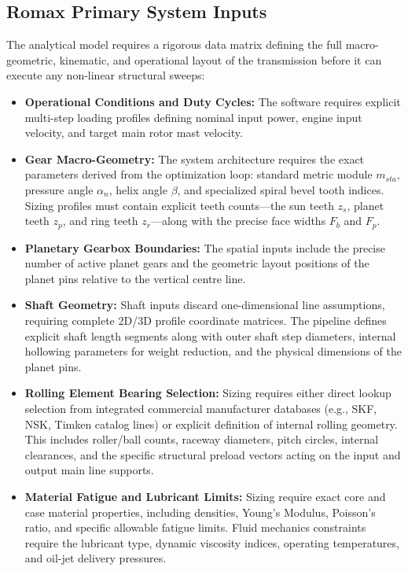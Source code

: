     \subsection{Romax Primary System Inputs}
        The analytical model requires a rigorous data matrix defining the full macro-geometric, 
        kinematic, and operational layout of the transmission before it can execute any non-linear 
        structural sweeps:
            \begin{itemize}
                \item \textbf{Operational Conditions and Duty Cycles:} The software requires explicit multi-step loading profiles defining nominal input power, engine input velocity, and target main rotor mast velocity.
                \item \textbf{Gear Macro-Geometry:} The system architecture requires the exact parameters derived from the optimization loop: standard metric module $m_{sta}$, pressure angle $\alpha_{n}$, helix angle $\beta$, and specialized spiral bevel tooth indices. Sizing profiles must contain explicit teeth counts—the sun teeth $z_{s}$, planet teeth $z_{p}$, and ring teeth $z_{r}$—along with the precise face widths $F_{b}$ and $F_{p}$.
                \item \textbf{Planetary Gearbox Boundaries:} The spatial inputs include the precise number of active planet gears and the geometric layout positions of the planet pins relative to the vertical centre line.
                \item \textbf{Shaft Geometry:} Shaft inputs discard one-dimensional line assumptions, requiring complete 2D/3D profile coordinate matrices. The pipeline defines explicit shaft length segments along with outer shaft step diameters, internal hollowing parameters for weight reduction, and the physical dimensions of the planet pins.
                \item \textbf{Rolling Element Bearing Selection:} Sizing requires either direct lookup selection from integrated commercial manufacturer databases (e.g., SKF, NSK, Timken catalog lines) or explicit definition of internal rolling geometry. This includes roller/ball counts, raceway diameters, pitch circles, internal clearances, and the specific structural preload vectors acting on the input and output main line supports.
                \item \textbf{Material Fatigue and Lubricant Limits:} Sizing require exact core and case material properties, including densities, Young's Modulus, Poisson's ratio, and specific allowable fatigue limits. Fluid mechanics constraints require the lubricant type, dynamic viscosity indices, operating temperatures, and oil-jet delivery pressures.
            \end{itemize}

